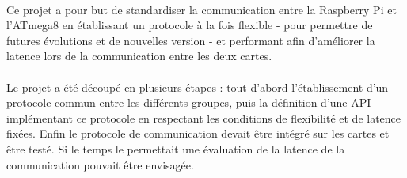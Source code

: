 \paragraph{}
Ce projet a pour but de standardiser la communication entre la Raspberry Pi et
l'ATmega8 en établissant un protocole à la fois flexible - pour permettre de
futures évolutions et de nouvelles version - et performant afin d'améliorer la
latence lors de la communication entre les deux cartes.

\paragraph{}
Le projet a été découpé en plusieurs étapes : tout d'abord l'établissement
d'un protocole commun entre les différents groupes, puis la définition d'une
API implémentant ce protocole en respectant les conditions de flexibilité et
de latence fixées. Enfin le protocole de communication devait être intégré sur
les cartes et être testé. Si le temps le permettait une évaluation de la
latence de la communication pouvait être envisagée.
